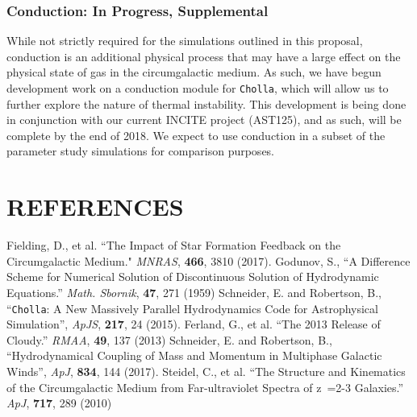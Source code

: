 \documentclass[11pt,letterpaper,english]{article}
\begin{document}
\vspace{-.2in}
\subsubsection{Conduction: In Progress, Supplemental}
\vspace{-.25in}

While not strictly required for the simulations outlined in this proposal, conduction is an additional physical process that may have a large effect on the physical state of gas in the circumgalactic medium. As such, we have begun development work on a conduction module for {\tt Cholla}, which will allow us to further explore the nature of thermal instability. This development is being done in conjunction with our current INCITE project (AST125), and as such, will be complete by the end of 2018. We expect to use conduction in a subset of the parameter study simulations for comparison purposes.

\vspace{-.3in}
\section{REFERENCES}
\vspace{-.3in}

\vspace{-.15in}

{\footnotesize

\renewcommand{\section}[2]{}
\begin{thebibliography}{500}
 Fielding, D., et al. ``The Impact of Star Formation Feedback on the Circumgalactic Medium." {\em MNRAS}, {\bf 466}, 3810 (2017).
 Godunov, S., ``A Difference Scheme for Numerical Solution of Discontinuous Solution of Hydrodynamic Equations.'' {\em Math. Sbornik}, {\bf 47}, 271 (1959)
\vspace{-.09in}
 Schneider, E. and Robertson, B., ``{\tt Cholla}: A New Massively Parallel Hydrodynamics Code for Astrophysical Simulation'', {\em ApJS}, {\bf 217}, 24 (2015).
\vspace{-.09in}
 Ferland, G., et al. ``The 2013 Release of Cloudy.'' {\em RMAA}, {\bf 49}, 137 (2013)
\vspace{-.09in}
 Schneider, E. and Robertson, B., ``Hydrodynamical Coupling of Mass and Momentum in Multiphase Galactic Winds'', {\em ApJ}, {\bf 834}, 144 (2017).
\vspace{-.09in}
 Steidel, C., et al. ``The Structure and Kinematics of the Circumgalactic Medium from Far-ultraviolet Spectra of z~=2-3 Galaxies.'' {\em ApJ}, {\bf 717}, 289 (2010)
\vspace{-.09in}
\end{thebibliography}
}
\end{document}
